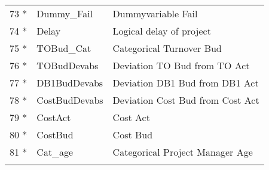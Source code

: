 \begin{longtable}[ht]{p{} p{}p{}}
73 *   & Dummy\_Fail & Dummyvariable Fail \\
74 *   & Delay & Logical delay of project \\
75 *   & TOBud\_Cat & Categorical Turnover Bud \\
76 *   & TOBudDevabs & Deviation TO Bud from TO Act \\
77 *   & DB1BudDevabs & Deviation DB1 Bud from DB1 Act \\
78 *   & CostBudDevabs & Deviation Cost Bud from Cost Act \\
79 *   & CostAct & Cost Act \\
80 *   & CostBud & Cost Bud \\
81 *   & Cat\_age & Categorical Project Manager Age \\
	\label{tab:addlabel}%
\end{longtable}%
\newpage
